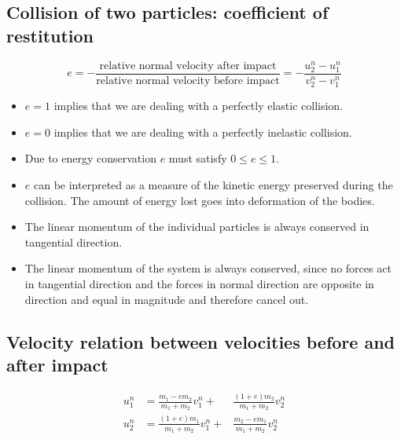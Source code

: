 \documentclass[10pt,a4paper]{scrartcl}
\begin{document}
\begin{multicols*}{2}
\subsection{Collision of two particles: coefficient of restitution}

\begin{equation*}
e=-\frac{\text{relative normal velocity after impact}}{\text{relative normal velocity before impact}}=-\frac{u_2^n-u_1^n}{v_2^n-v_1^n}
\end{equation*}


\begin{itemize}
\item $e=1$ implies that we are dealing with a perfectly elastic collision.
\item $e=0$ implies that we are dealing with a perfectly inelastic collision.
\item Due to energy conservation $e$ must satisfy $0\leq e\leq 1$.
\item $e$ can be interpreted as a measure of the kinetic energy preserved during the collision. The amount of energy lost goes into deformation of the bodies.
\item The linear momentum of the individual particles is always conserved in tangential direction.
\item The linear momentum of the system is always conserved, since no forces act in tangential direction and the forces in normal direction are opposite in direction and equal in magnitude and therefore cancel out.
\end{itemize}

\subsection{Velocity relation between velocities before and after impact}

\begin{alignat}{3}
u_1^n&=\frac{m_1-em_2}{m_1+m_2}v_1^n+&\frac{(1+e)m_2}{m_1+m_2}v_2^n \\
u_2^n&=\frac{(1+e)m_1}{m_1+m_2}v_1^n+&\frac{m_2-em_1}{m_1+m_2}v_2^n
\end{alignat}



\end{multicols*}
\end{document}
